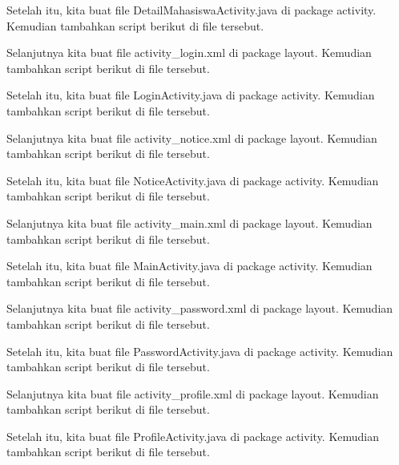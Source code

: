 Setelah itu, kita buat file DetailMahasiswaActivity.java di package activity. Kemudian tambahkan script berikut di file tersebut.


Selanjutnya kita buat file activity\_login.xml di package layout. Kemudian tambahkan script berikut di file tersebut.


Setelah itu, kita buat file LoginActivity.java di package activity. Kemudian tambahkan script berikut di file tersebut.


Selanjutnya kita buat file activity\_notice.xml di package layout. Kemudian tambahkan script berikut di file tersebut.


Setelah itu, kita buat file NoticeActivity.java di package activity. Kemudian tambahkan script berikut di file tersebut.


Selanjutnya kita buat file activity\_main.xml di package layout. Kemudian tambahkan script berikut di file tersebut.


Setelah itu, kita buat file MainActivity.java di package activity. Kemudian tambahkan script berikut di file tersebut.


Selanjutnya kita buat file activity\_password.xml di package layout. Kemudian tambahkan script berikut di file tersebut.


Setelah itu, kita buat file PasswordActivity.java di package activity. Kemudian tambahkan script berikut di file tersebut.


Selanjutnya kita buat file activity\_profile.xml di package layout. Kemudian tambahkan script berikut di file tersebut.


Setelah itu, kita buat file ProfileActivity.java di package activity. Kemudian tambahkan script berikut di file tersebut.


